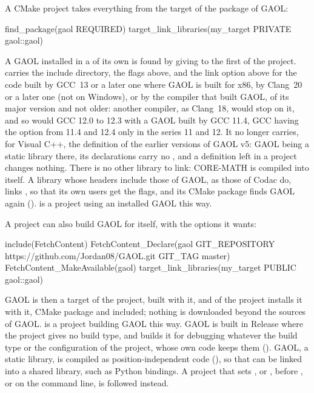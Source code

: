 A CMake project takes everything from the target  of the
package of GAOL:

\begin{example}
find_package(gaol REQUIRED)
target_link_libraries(my_target PRIVATE gaol::gaol)
\end{example}

\noindent
A GAOL installed in a  of its own is found by giving
 to the first  of the
project.  carries the include directory, the flags above, and the
link option above for the code built by GCC~13 or a later one where GAOL is
built for x86, by Clang~20 or a later one (not on Windows), or by the
compiler that built GAOL, of its major version and not older: another
compiler, as Clang~18, would stop on it, and so would GCC 12.0 to 12.3 with a
GAOL built by GCC 11.4, GCC having the option from 11.4 and 12.4 only in the
series 11 and 12. It no longer carries, for Visual C++, the definition
 of the earlier versions of GAOL v5: GAOL being a static library there, its
declarations carry no , and a definition left in
a project changes nothing.\newinvfive{} There is no other library to link:
CORE-MATH is compiled into  itself. A library whose headers
include those of GAOL, as those of Codac do, links 
, so that its own users get the flags, and its CMake package
finds GAOL again (). 
is a project using an installed GAOL this way.

A project can also build GAOL for itself, with the options it wants:

\begin{example}
include(FetchContent)
FetchContent_Declare(gaol GIT_REPOSITORY
    https://github.com/Jordan08/GAOL.git GIT_TAG master)
FetchContent_MakeAvailable(gaol)
target_link_libraries(my_target PUBLIC gaol::gaol)
\end{example}

\noindent
GAOL is then a target of the project, built with it, and 
of the project installs it with it, CMake package and 
included; nothing is downloaded beyond the sources of GAOL.
 is a project building GAOL this way. GAOL is built
in Release where the project gives no build type, and
 builds it for debugging whatever the build type or
the configuration of the project, whose own code keeps them
().\newinvfive{} GAOL, a static library, is compiled
as position-independent code (), so that  can
be linked into a shared library, such as Python bindings. A project that sets
,  or , before
, or on the command line, is followed
instead.


